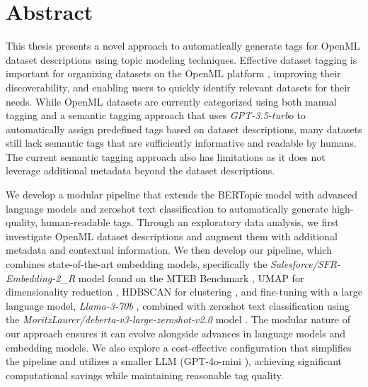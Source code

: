 \chapter*{Abstract}\label{chapter:abstract}

This thesis presents a novel approach to automatically generate tags for OpenML dataset descriptions using topic modeling techniques. Effective dataset tagging is important for organizing datasets on the OpenML platform \cite{vanschoren_openml_2014}, improving their discoverability, and enabling users to quickly identify relevant datasets for their needs. While OpenML datasets are currently categorized using both manual tagging and a semantic tagging approach that uses \textit{GPT-3.5-turbo} to automatically assign predefined tags based on dataset descriptions, many datasets still lack semantic tags that are sufficiently informative and readable by humans. The current semantic tagging approach also has limitations as it does not leverage additional metadata beyond the dataset descriptions.

We develop a modular pipeline that extends the BERTopic model \cite{grootendorst_bertopic_2022} with advanced language models and zeroshot text classification to automatically generate high-quality, human-readable tags. Through an exploratory data analysis, we first investigate OpenML dataset descriptions and augment them with additional metadata and contextual information. We then develop our pipeline, which combines state-of-the-art embedding models, specifically the \textit{Salesforce/SFR-Embedding-2\_R} \cite{noauthor_salesforcesfr-embedding-2_r_2024} model found on the MTEB Benchmark \cite{muennighoff_mteb_2023}, UMAP for dimensionality reduction \cite{mcinnes_umap_2020}, HDBSCAN for clustering \cite{campello_density-based_2013, mcinnes_accelerated_2017, mcinnes_hdbscan_2017}, and fine-tuning with a large language model, \textit{Llama-3-70b} \cite{noauthor_introducing_nodate} , combined with zeroshot text classification using the \textit{MoritzLaurer/deberta-v3-large-zeroshot-v2.0} model \cite{noauthor_milanlproccontextualized-topic-models_2024}. The modular nature of our approach ensures it can evolve alongside advances in language models and embedding models. We also explore a cost-effective configuration that simplifies the pipeline and utilizes a smaller LLM (GPT-4o-mini \cite{noauthor_gpt-4o_nodate}), achieving significant computational savings while maintaining reasonable tag quality.

